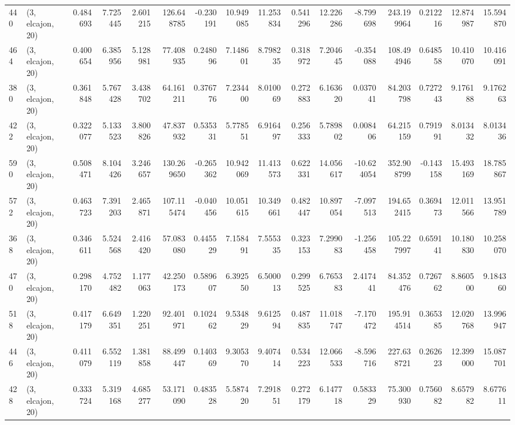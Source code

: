 \begin{tabular}{llrrrrrrrrrrrrrr}
440 &  (3, elcajon, 20) &   0.484693 &   7.725445 &   2.601215 &   126.648785 &  -0.230191 &  10.949085 &  11.253834 &  0.541296 &  12.226286 &  -8.799698 &   243.199964 &  0.212216 &  12.874987 &  15.594870 \\
464 &  (3, elcajon, 20) &   0.400654 &   6.385956 &   5.128981 &    77.408935 &   0.248096 &   7.148601 &   8.798235 &  0.318972 &   7.204645 &  -0.354088 &   108.494946 &  0.648558 &  10.410070 &  10.416091 \\
380 &  (3, elcajon, 20) &   0.361848 &   5.767428 &   3.438702 &    64.161211 &   0.376776 &   7.234400 &   8.010069 &  0.272883 &   6.163620 &   0.037041 &    84.203798 &  0.727243 &   9.176188 &   9.176263 \\
422 &  (3, elcajon, 20) &   0.322077 &   5.133523 &   3.800826 &    47.837932 &   0.535331 &   5.778551 &   6.916497 &  0.256333 &   5.789802 &   0.008406 &    64.215159 &  0.791991 &   8.013432 &   8.013436 \\
590 &  (3, elcajon, 20) &   0.508471 &   8.104426 &   3.246657 &   130.269650 &  -0.265362 &  10.942069 &  11.413573 &  0.622331 &  14.056617 & -10.624054 &   352.908799 & -0.143158 &  15.493169 &  18.785867 \\
572 &  (3, elcajon, 20) &   0.463723 &   7.391203 &   2.465871 &   107.115474 &  -0.040456 &  10.051615 &  10.349661 &  0.482447 &  10.897054 &  -7.097513 &   194.652415 &  0.369473 &  12.011566 &  13.951789 \\
368 &  (3, elcajon, 20) &   0.346611 &   5.524568 &   2.416420 &    57.083080 &   0.445529 &   7.158491 &   7.555335 &  0.323153 &   7.299083 &  -1.256458 &   105.227997 &  0.659141 &  10.180830 &  10.258070 \\
470 &  (3, elcajon, 20) &   0.298170 &   4.752482 &   1.177063 &    42.250173 &   0.589607 &   6.392550 &   6.500013 &  0.299525 &   6.765383 &   2.417441 &    84.352476 &  0.726762 &   8.860500 &   9.184360 \\
518 &  (3, elcajon, 20) &   0.417179 &   6.649351 &   1.220251 &    92.401971 &   0.102462 &   9.534829 &   9.612594 &  0.487835 &  11.018747 &  -7.170472 &   195.914514 &  0.365385 &  12.020768 &  13.996947 \\
446 &  (3, elcajon, 20) &   0.411079 &   6.552119 &   1.381858 &    88.499447 &   0.140369 &   9.305370 &   9.407414 &  0.534223 &  12.066533 &  -8.596716 &   227.638721 &  0.262623 &  12.399000 &  15.087701 \\
428 &  (3, elcajon, 20) &   0.333724 &   5.319168 &   4.685277 &    53.171090 &   0.483528 &   5.587420 &   7.291851 &  0.272179 &   6.147718 &   0.583329 &    75.300930 &  0.756082 &   8.657982 &   8.677611 \\

\end{tabular}
